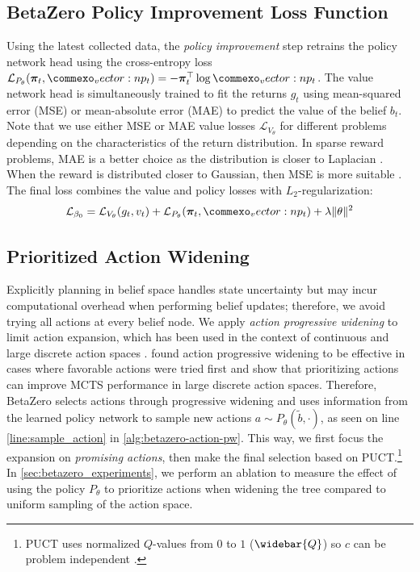 \subsection{BetaZero Policy Improvement Loss Function}
Using the latest collected data, the \textit{policy improvement} step retrains the policy network head using the cross-entropy loss $\mathcal{L}_{P_\theta}(\bpi_t, \vect{p}_t) = -\bpi_t^\top \log \vect{p}_t$.
The value network head is simultaneously trained to fit the returns $g_t$ using mean-squared error (MSE) or mean-absolute error (MAE) to predict the value of the belief $b_t$.
Note that we use either MSE or MAE value losses $\mathcal{L}_{V_\theta}$ for different problems depending on the characteristics of the return distribution.
In sparse reward problems, MAE is a better choice as the distribution is closer to Laplacian \cite{hodson2022root}.
When the reward is distributed closer to Gaussian, then MSE is more suitable \cite{chai2014root}.
The final loss combines the value and policy losses with $L_2$-regularization:
\begin{equation}
    \mathcal{L}_{\beta_0} = \mathcal{L}_{V_\theta}(g_t, v_t) + \mathcal{L}_{P_\theta}(\bpi_t, \vect{p}_t) + \lambda\norm{\theta}^2
\end{equation}

\subsection{Prioritized Action Widening}
Explicitly planning in belief space handles state uncertainty but may incur computational overhead when performing belief updates; therefore, we avoid trying all actions at every belief node.
We apply \textit{action progressive widening} \cite{couetoux2011continuous} to limit action expansion, which has been used in the context of continuous and large discrete action spaces \cite{moerland2018a0c,yee2016monte}. 
\textcite{browne2012survey} found action progressive widening to be effective in cases where favorable actions were tried first and \textcite{mern2021improved} show that prioritizing actions can improve MCTS performance in large discrete action spaces. 
Therefore, BetaZero selects actions through progressive widening and uses information from the learned policy network to sample new actions $a \sim P_\theta(\tilde{b}, \cdot)$, as seen on line \ref*{line:sample_action} in \cref{alg:betazero-action-pw}.
This way, we first focus the expansion on \textit{promising actions}, then make the final selection based on PUCT.\footnote{PUCT uses normalized $Q$-values from $0$ to $1$ ($\widebar{Q}$) so $c$ can be problem independent \cite{schrittwieser2020mastering}.}
In \cref{sec:betazero_experiments}, we perform an ablation to measure the effect of using the policy $P_\theta$ to prioritize actions when widening the tree compared to uniform sampling of the action space.


